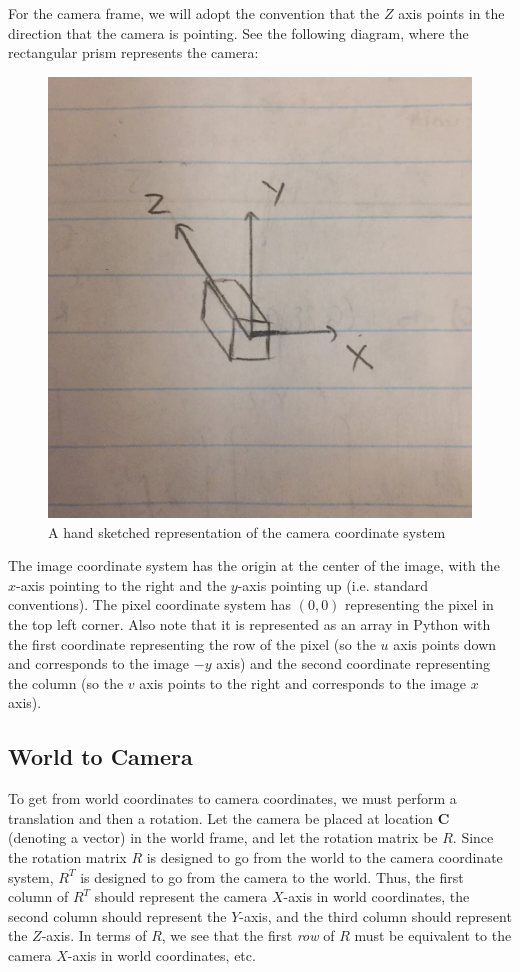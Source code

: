 \documentclass{article}
\begin{document}
For the camera frame, we will adopt the convention that the $Z$ axis points in the direction that the camera is pointing. 
See the following diagram, where the rectangular prism represents the camera:

\begin{figure}[H]
\includegraphics[scale=0.1]{Camera_Coordinates}
\centering
\caption*{A hand sketched representation of the camera coordinate system}
\end{figure}

The image coordinate system has the origin at the center of the image, with the $x$-axis pointing to the right and the $y$-axis pointing up (i.e. standard conventions). 
The pixel coordinate system has $(0, 0)$ representing the pixel in the top left corner. 
Also note that it is represented as an array in Python with the first coordinate representing the row of the pixel 
(so the $u$ axis points down and corresponds to the image $-y$ axis) and the second coordinate representing the column 
(so the $v$ axis points to the right and corresponds to the image $x$ axis).

\subsection{World to Camera}
To get from world coordinates to camera coordinates, we must perform a translation and then a rotation. 
Let the camera be placed at location $\bm{C}$ (denoting a vector) in the world frame, and let the rotation matrix be $R$. 
Since the rotation matrix $R$ is designed to go from the world to the camera coordinate system, $R^{T}$ is designed to go from the camera to the world. 
Thus, the first column of $R^{T}$ should represent the camera $X$-axis in world coordinates, the second column should represent the $Y$-axis, 
and the third column should represent the $Z$-axis. 
In terms of $R$, we see that the first \textit{row} of $R$ must be equivalent to the camera $X$-axis in world coordinates, etc. \\
\end{document}
